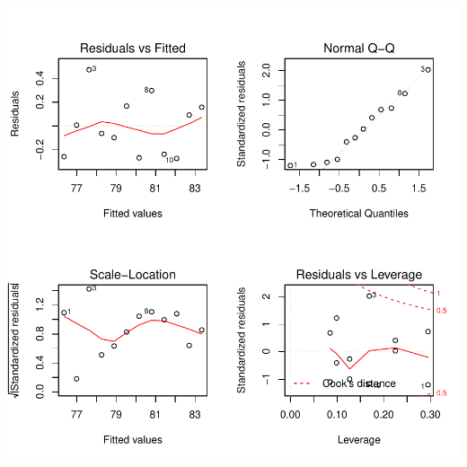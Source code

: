 \documentclass[onecolumn,12pt]{book}
\begin{document}
\begin{Schunk}
\end{Schunk}
\includegraphics{RbookParte2-057}
\end{document}
